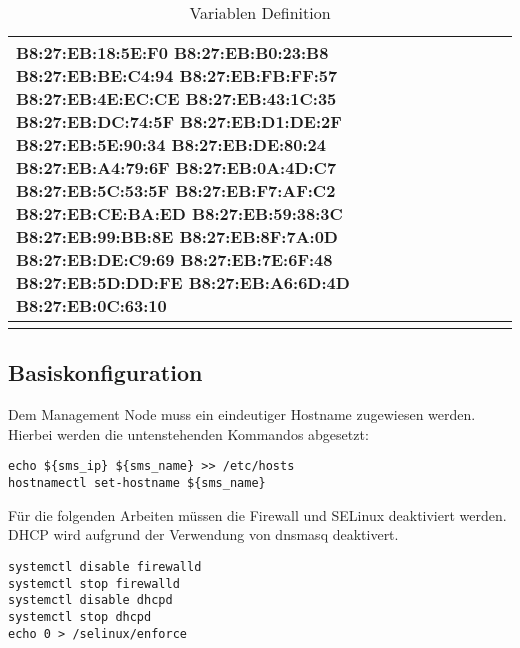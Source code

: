 \begin{longtable}{| p{0.5cm} | p{3cm} | p{8.5cm} | p{4cm} |}
\newline B8:27:EB:18:5E:F0 \newline B8:27:EB:B0:23:B8 \newline B8:27:EB:BE:C4:94 \newline B8:27:EB:FB:FF:57 \newline B8:27:EB:4E:EC:CE \newline 	B8:27:EB:43:1C:35 \newline B8:27:EB:DC:74:5F \newline B8:27:EB:D1:DE:2F \newline B8:27:EB:5E:90:34 \newline B8:27:EB:DE:80:24 \newline B8:27:EB:A4:79:6F \newline B8:27:EB:0A:4D:C7 \newline B8:27:EB:5C:53:5F \newline B8:27:EB:F7:AF:C2 \newline B8:27:EB:CE:BA:ED \newline B8:27:EB:59:38:3C \newline B8:27:EB:99:BB:8E \newline B8:27:EB:8F:7A:0D \newline B8:27:EB:DE:C9:69 \newline B8:27:EB:7E:6F:48 \newline B8:27:EB:5D:DD:FE
\newline B8:27:EB:A6:6D:4D \newline B8:27:EB:0C:63:10\\\hline 
\caption{Variablen Definition}
\end{longtable}

\subsection{Basiskonfiguration}
Dem Management Node muss ein eindeutiger Hostname zugewiesen werden. Hierbei werden die untenstehenden Kommandos abgesetzt:

\begin{lstlisting}
echo ${sms_ip} ${sms_name} >> /etc/hosts
hostnamectl set-hostname ${sms_name}
\end{lstlisting}

Für die folgenden Arbeiten müssen die Firewall und SELinux deaktiviert werden. DHCP wird aufgrund der Verwendung von dnsmasq deaktivert.

\begin{lstlisting}
systemctl disable firewalld
systemctl stop firewalld
systemctl disable dhcpd
systemctl stop dhcpd
echo 0 > /selinux/enforce
\end{lstlisting}

